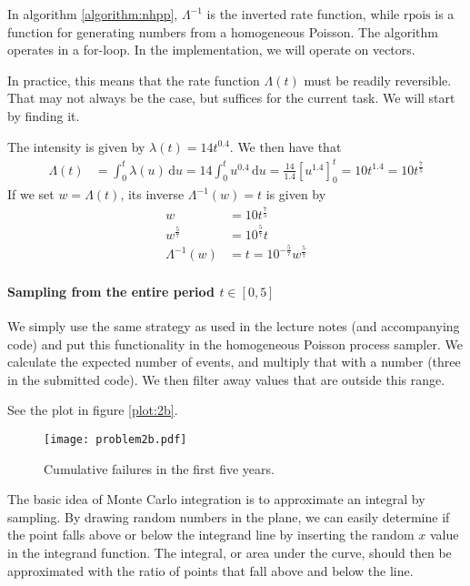 \documentclass[a4paper,english,12pt]{article}
\begin{document}
In algorithm \vref{algorithm:nhpp}, $\Lambda^{-1}$ is the inverted rate
function, while $\textrm{rpois}$ is a function for generating numbers from a
homogeneous Poisson. The algorithm operates in a for-loop. In the
implementation, we will operate on vectors.

In practice, this means that the rate function $\Lambda(t)$ must be readily
reversible. That may not always be the case, but suffices for the current task.
We will start by finding it.

The intensity is given by $\lambda(t) = 14t^{0.4}$. We then have that
\begin{align*}
  \Lambda(t) &= \int_0^t{\lambda(u)}\, \textrm{d}u
    =  14\int_0^t{u^{0.4}}\, \textrm{d}u
    = \frac{14}{1.4}\left[ u^{1.4} \right]_0^t = 10t^{1.4} = 10t^{\frac{7}{5}}
\end{align*}
If we set $w = \Lambda(t)$, its inverse $\Lambda^{-1}(w) = t$ is given by
\begin{align*}
  w &= 10t^{\frac{7}{5}} \\
  w^{\frac{5}{7}} &= 10^{\frac{5}{7}}t \\
  \Lambda^{-1}(w) &= t = 10^{-\frac{5}{7}} w^{\frac{5}{7}}
\end{align*}

\paragraph{Sampling from the entire period $t \in [0,5]$}
We simply use the same strategy as used in the lecture notes (and accompanying
code) and put this functionality in the homogeneous Poisson process sampler.
We calculate the expected number of events, and multiply that with a number
(three in the submitted code). We then filter away values that are outside this
range.

See the plot in figure \vref{plot:2b}.

\begin{figure}
  \centering
  \texttt{[image: problem2b.pdf]}
  \caption{Cumulative failures in the first five years.}
  \label{plot:2b}
\end{figure}


\clearpage
{}
The basic idea of Monte Carlo integration is to approximate an integral by
sampling. By drawing random numbers in the plane, we can easily determine if
the point falls above or below the integrand line by inserting the random $x$
value in the integrand function. The integral, or area under the curve, should
then be approximated with the ratio of points that fall above and below the
line.
\end{document}
